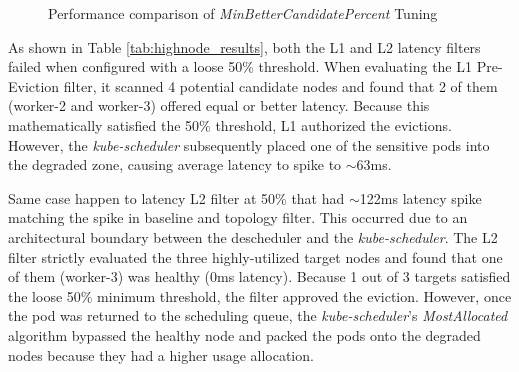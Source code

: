 \begin{figure}[tbp]
{%
    }
    \caption{Performance comparison of \textit{MinBetterCandidatePercent} Tuning}
    \label{fig:highnode_results}
\end{figure}

As shown in Table \ref{tab:highnode_results}, both the L1 and L2 latency filters failed when configured with a loose 50\% threshold. When evaluating the L1 Pre-Eviction filter, it scanned 4 potential candidate nodes and found that 2 of them (worker-2 and worker-3) offered equal or better latency. Because this mathematically satisfied the 50\% threshold, L1 authorized the evictions. However, the \textit{kube-scheduler} subsequently placed one of the sensitive pods into the degraded zone, causing average latency to spike to $\sim$63ms.

Same case happen to latency L2 filter at 50\% that had $\sim$122ms latency spike matching the spike in baseline and topology filter. This occurred due to an architectural boundary between the descheduler and the \textit{kube-scheduler}. The L2 filter strictly evaluated the three highly-utilized target nodes and found that one of them (worker-3) was healthy (0ms latency). Because 1 out of 3 targets satisfied the loose 50\% minimum threshold, the filter approved the eviction. However, once the pod was returned to the scheduling queue, the \textit{kube-scheduler}'s \textit{MostAllocated} algorithm bypassed the healthy node and packed the pods onto the degraded nodes because they had a higher usage allocation.


